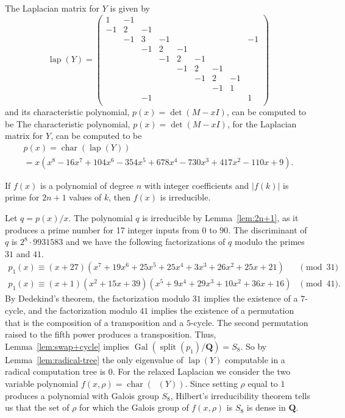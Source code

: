 \documentclass[oribibl,10pt]{llncs}
\newcommand{\rationals}{\mathbf{Q}}
\DeclareMathOperator{\Gal}{Gal}
\DeclareMathOperator{\splitting}{split}
\DeclareMathOperator{\laplacian}{lap}
\DeclareMathOperator{\rlaplacian}{lap_\rho}
\DeclareMathOperator{\characteristic}{char}
\begin{document}
\ifFull
The Laplacian matrix for $Y$ is given by
\[
\laplacian(Y) =
\begin{pmatrix}
1&-1&  &  &  &  &  &  &  \\
-1& 2&-1&  &  &  &  &  &  \\
 &-1& 3&-1&  &  &  &  &-1\\
 &  &-1& 2&-1&  &  &  &  \\
 &  &  &-1& 2&-1&  &  &  \\
 &  &  &  &-1& 2&-1&  &  \\
 &  &  &  &  &-1& 2&-1&  \\
 &  &  &  &  &  &-1& 1&  \\
 &  &-1&  &  &  &  &  & 1\\
\end{pmatrix} 
\]
and its characteristic polynomial, $ p(x) = \det(M - xI)$,
can be computed to be
\else
The characteristic polynomial, $ p(x) = \det(M - xI)$,
for the Laplacian matrix for $Y$,
can be computed to be
\fi
\begin{multline*}
p(x) = \characteristic(\laplacian(Y))\\ = x   (x^8 - 16 x^7 + 104 x^6 - 354 x^5 + 678 x^4 - 730 x^3 + 417 x^2 - 110 x + 9).
\end{multline*}

\begin{lemma}\label{lem:2n+1}
If $f(x)$ is a polynomial of degree $n$ with integer coefficients and $\vert f(k) \vert$ is prime for $2n+1$ values of $k$, then $f(x)$ is irreducible.
\end{lemma}

Let $q = p(x) / x$. The polynomial $q$ is irreducible by Lemma~\ref{lem:2n+1}, as it produces a prime number for 17 integer inputs from $0$ to $90$. The discriminant of $q$ is $2^8 \cdot 9931583$ and we have the following factorizations of $q$ modulo the primes $31$ and $41$.
\begin{align*}
p_1(x) \equiv (x + 27)  (x^7 + 19x^6 + 25x^5 + 25x^4 + 3x^3 + 26x^2 + 25x + 21) &\pmod{31} \\
p_1(x) \equiv (x + 1)  (x^2 + 15x + 39)  (x^5 + 9x^4 + 29x^3 + 10x^2 + 36x + 16) &\pmod{41}.
\end{align*}
By Dedekind's theorem, the factorization modulo $31$ implies the existence of a $7$-cycle, and the factorization modulo $41$ implies the existence of a permutation that is the composition of a transposition and a $5$-cycle. The second permutation raised to the fifth power produces a transposition. Thus, Lemma~\ref{lem:swap+cycle} implies $\Gal(\splitting(p_1)/\rationals) = S_8$. So by Lemma~\ref{lem:radical-tree} the only eigenvalue of $\laplacian(Y)$ computable in a radical computation tree is 0.
For the relaxed Laplacian we consider the two variable polynomial $f(x,\rho) = \characteristic(\rlaplacian(Y))$. Since setting $\rho$ equal to $1$ produces a polynomial with Galois group $S_8$, Hilbert's irreducibility theorem tells us that the set of $\rho$ for which the Galois group of $f(x,\rho)$ is $S_8$ is dense in $\rationals$.
\end{document}
